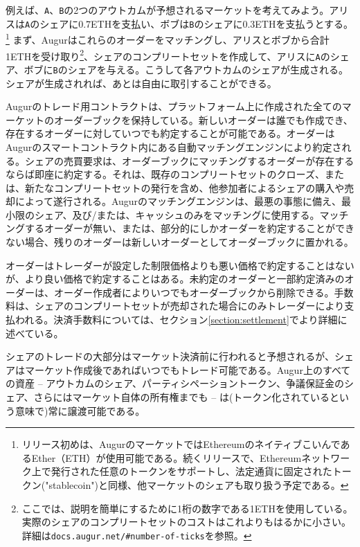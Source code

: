 \documentclass[floatfix,reprint,nofootinbib,amsmath,amssymb,epsfig,pre,floats,letterpaper,groupedaffiliation]{revtex4-1}
\theoremstyle{definition}
\theoremstyle{definition}
\theoremstyle{definition}
\begin{document}
例えば、\texttt{A}、\texttt{B}の2つのアウトカムが予想されるマーケットを考えてみよう。アリスは\texttt{A}のシェアに0.7ETHを支払い、ボブは\texttt{B}のシェアに0.3ETHを支払うとする。\footnote{リリース初めは、AugurのマーケットではEthereumのネイティブこいんであるEther（ETH）が使用可能である。続くリリースで、Ethereumネットワーク上で発行された任意のトークンをサポートし、法定通貨に固定されたトークン("stablecoin")と同様、他マーケットのシェアも取り扱う予定である。} まず、Augurはこれらのオーダーをマッチングし、アリスとボブから合計1ETHを受け取り\footnote{ここでは、説明を簡単にするために1桁の数字である1ETHを使用している。実際のシェアのコンプリートセットのコストはこれよりもはるかに小さい。詳細は\texttt{docs.augur.net/\#number-of-ticks}を参照。\label{footnote:complete_set_cost}}、シェアのコンプリートセットを作成して、アリスに\texttt{A}のシェア、ボブに\texttt{B}のシェアを与える。こうして各アウトカムのシェアが生成される。シェアが生成されれば、あとは自由に取引することができる。

Augurのトレード用コントラクトは、プラットフォーム上に作成された全てのマーケットのオーダーブックを保持している。新しいオーダーは誰でも作成でき、存在するオーダーに対していつでも約定することが可能である。オーダーはAugurのスマートコントラクト内にある自動マッチングエンジンにより約定される。シェアの売買要求は、オーダーブックにマッチングするオーダーが存在するならば即座に約定する。それは、既存のコンプリートセットのクローズ、または、新たなコンプリートセットの発行を含め、他参加者によるシェアの購入や売却によって遂行される。Augurのマッチングエンジンは、最悪の事態に備え、最小限のシェア、及び/または、キャッシュのみをマッチングに使用する。マッチングするオーダーが無い、または、部分的にしかオーダーを約定することができない場合、残りのオーダーは新しいオーダーとしてオーダーブックに置かれる。

オーダーはトレーダーが設定した制限価格よりも悪い価格で約定することはないが、より良い価格で約定することはある。未約定のオーダーと一部約定済みのオーダーは、オーダー作成者によりいつでもオーダーブックから削除できる。手数料は、シェアのコンプリートセットが売却された場合にのみトレーダーにより支払われる。決済手数料については、セクション\ref{section:settlement}でより詳細に述べている。

シェアのトレードの大部分はマーケット決済前に行われると予想されるが、シェアはマーケット作成後であればいつでもトレード可能である。Augur上のすべての資産 -- アウトカムのシェア、パーティシペーショントークン、争議保証金のシェア、さらにはマーケット自体の所有権までも -- は(トークン化されているという意味で)常に譲渡可能である。
\end{document}
